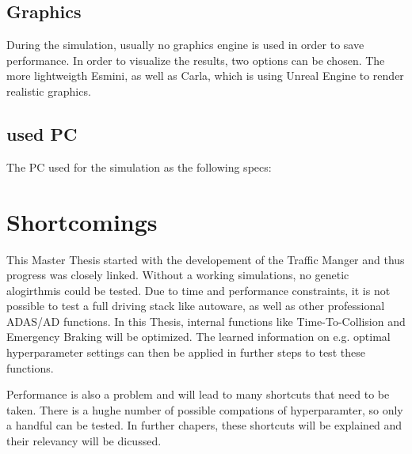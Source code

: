 \subsection{Graphics}
During the simulation, usually no graphics engine is used in order to save performance. In order to visualize the results, two options can be chosen. The more lightweigth Esmini, as well as Carla, which is using Unreal Engine to render realistic graphics.

\subsection{used PC}
The PC used for the simulation as the following specs:

\section{Shortcomings}
This Master Thesis started with the developement of the Traffic Manger and thus progress was closely linked. Without a working simulations, no genetic alogirthmis could be tested. Due to time and performance constraints, it is not possible to test a full driving stack like autoware, as well as other professional ADAS/AD functions.
In this Thesis, internal functions like Time-To-Collision and Emergency Braking will be optimized. The learned  information on e.g. optimal hyperparameter settings can then be applied in further steps to test these functions.

Performance is also a problem and will lead to many shortcuts that need to be taken. There is a hughe number of possible compations of hyperparamter, so only a handful can be tested. In further chapers, these shortcuts will be explained and their relevancy will be dicussed.